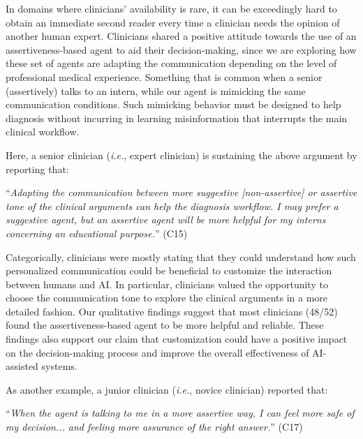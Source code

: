 In domains where clinicians' availability is rare, it can be exceedingly hard to obtain an immediate second reader every time a clinician needs the opinion of another human expert.
Clinicians shared a positive attitude towards the use of an assertiveness-based agent to aid their decision-making, since we are exploring how these set of agents are adapting the communication depending on the level of professional medical experience.
Something that is common when a senior (assertively) talks to an intern, while our agent is mimicking the same communication conditions.
Such mimicking behavior must be designed to help diagnosis without incurring in learning misinformation that interrupts the main clinical workflow.

\noindent
Here, a senior clinician ({\it i.e.}, expert clinician) is sustaining the above argument by reporting that:

\vspace{2.5mm}

\noindent
``{\it Adapting the communication between more suggestive [non-assertive] or assertive tone of the clinical arguments can help the diagnosis workflow. I may prefer a suggestive agent, but an assertive agent will be more helpful for my interns concerning an educational purpose.}'' (C15)

\vspace{2.5mm}

Categorically, clinicians were mostly stating that they could understand how such personalized communication could be beneficial to customize the interaction between humans and AI.
In particular, clinicians valued the opportunity to choose the communication tone to explore the clinical arguments in a more detailed fashion.
Our qualitative findings suggest that most clinicians (48/52) found the assertiveness-based agent to be more helpful and reliable.
These findings also support our claim that customization could have a positive impact on the decision-making process and improve the overall effectiveness of AI-assisted systems.

\vspace{2.5mm}

\noindent
As another example, a junior clinician ({\it i.e.}, novice clinician) reported that:

\vspace{2.5mm}

\noindent
``{\it When the agent is talking to me in a more assertive way, I can feel more safe of my decision... and feeling more assurance of the right answer.}'' (C17)


